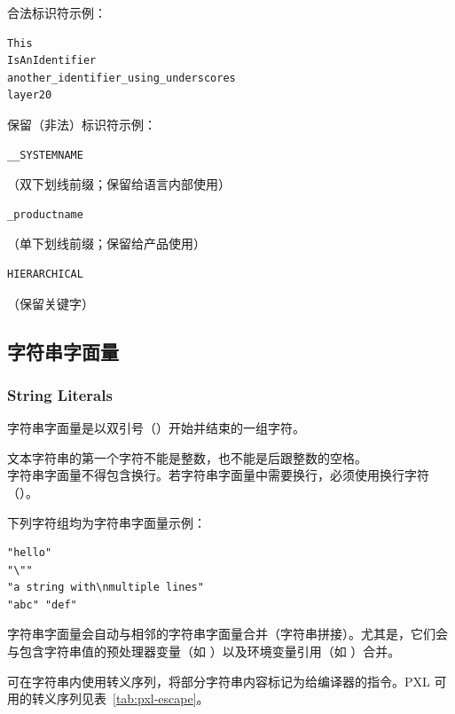 合法标识符示例：
\begin{lstlisting}[style=pxl]
This
IsAnIdentifier
another_identifier_using_underscores
layer20
\end{lstlisting}

保留（非法）标识符示例：
\begin{lstlisting}[style=pxl]
__SYSTEMNAME
\end{lstlisting}
（双下划线前缀；保留给语言内部使用）

\begin{lstlisting}[style=pxl]
_productname
\end{lstlisting}
（单下划线前缀；保留给产品使用）

\begin{lstlisting}[style=pxl]
HIERARCHICAL
\end{lstlisting}
（保留关键字）

\subsection{字符串字面量}
\subsubsection*{String Literals}

字符串字面量是以双引号（）开始并结束的一组字符。

\begin{noteBox}
文本字符串的第一个字符不能是整数，也不能是后跟整数的空格。\\
字符串字面量不得包含换行。若字符串字面量中需要换行，必须使用换行字符（）。
\end{noteBox}

下列字符组均为字符串字面量示例：
\begin{lstlisting}[style=pxl]
"hello"
"\""
"a string with\nmultiple lines"
"abc" "def"
\end{lstlisting}

字符串字面量会自动与相邻的字符串字面量合并（字符串拼接）。尤其是，它们会与包含字符串值的预处理器变量（如 ）以及环境变量引用（如 ）合并。

可在字符串内使用转义序列，将部分字符串内容标记为给编译器的指令。PXL 可用的转义序列见表~\ref{tab:pxl-escape}。

